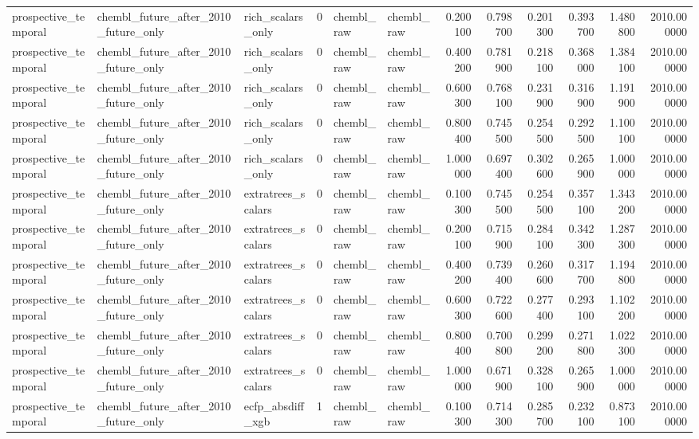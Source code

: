 \begin{longtable}{lllrllrrrrrr}
prospective\_temporal & chembl\_future\_after\_2010\_future\_only & rich\_scalars\_only & 0 & chembl\_raw & chembl\_raw & 0.200100 & 0.798700 & 0.201300 & 0.393700 & 1.480800 & 2010.000000 \\
prospective\_temporal & chembl\_future\_after\_2010\_future\_only & rich\_scalars\_only & 0 & chembl\_raw & chembl\_raw & 0.400200 & 0.781900 & 0.218100 & 0.368000 & 1.384100 & 2010.000000 \\
prospective\_temporal & chembl\_future\_after\_2010\_future\_only & rich\_scalars\_only & 0 & chembl\_raw & chembl\_raw & 0.600300 & 0.768100 & 0.231900 & 0.316900 & 1.191900 & 2010.000000 \\
prospective\_temporal & chembl\_future\_after\_2010\_future\_only & rich\_scalars\_only & 0 & chembl\_raw & chembl\_raw & 0.800400 & 0.745500 & 0.254500 & 0.292500 & 1.100100 & 2010.000000 \\
prospective\_temporal & chembl\_future\_after\_2010\_future\_only & rich\_scalars\_only & 0 & chembl\_raw & chembl\_raw & 1.000000 & 0.697400 & 0.302600 & 0.265900 & 1.000000 & 2010.000000 \\
prospective\_temporal & chembl\_future\_after\_2010\_future\_only & extratrees\_scalars & 0 & chembl\_raw & chembl\_raw & 0.100300 & 0.745500 & 0.254500 & 0.357100 & 1.343200 & 2010.000000 \\
prospective\_temporal & chembl\_future\_after\_2010\_future\_only & extratrees\_scalars & 0 & chembl\_raw & chembl\_raw & 0.200100 & 0.715900 & 0.284100 & 0.342300 & 1.287300 & 2010.000000 \\
prospective\_temporal & chembl\_future\_after\_2010\_future\_only & extratrees\_scalars & 0 & chembl\_raw & chembl\_raw & 0.400200 & 0.739400 & 0.260600 & 0.317700 & 1.194800 & 2010.000000 \\
prospective\_temporal & chembl\_future\_after\_2010\_future\_only & extratrees\_scalars & 0 & chembl\_raw & chembl\_raw & 0.600300 & 0.722600 & 0.277400 & 0.293100 & 1.102200 & 2010.000000 \\
prospective\_temporal & chembl\_future\_after\_2010\_future\_only & extratrees\_scalars & 0 & chembl\_raw & chembl\_raw & 0.800400 & 0.700800 & 0.299200 & 0.271800 & 1.022300 & 2010.000000 \\
prospective\_temporal & chembl\_future\_after\_2010\_future\_only & extratrees\_scalars & 0 & chembl\_raw & chembl\_raw & 1.000000 & 0.671900 & 0.328100 & 0.265900 & 1.000000 & 2010.000000 \\
prospective\_temporal & chembl\_future\_after\_2010\_future\_only & ecfp\_absdiff\_xgb & 1 & chembl\_raw & chembl\_raw & 0.100300 & 0.714300 & 0.285700 & 0.232100 & 0.873100 & 2010.000000 \\

\end{longtable}
